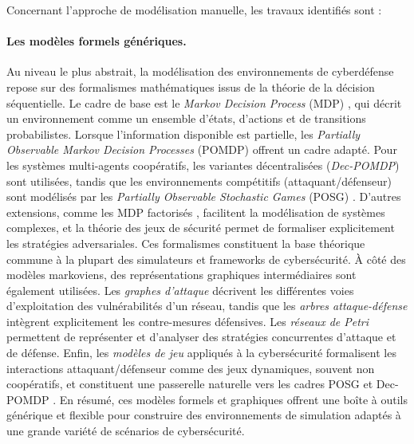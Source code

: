 Concernant l'approche de modélisation manuelle, les travaux identifiés sont :

\paragraph{Les modèles formels génériques.}
Au niveau le plus abstrait, la modélisation des environnements de cyberdéfense repose sur des formalismes mathématiques issus de la théorie de la décision séquentielle. Le cadre de base est le \textit{Markov Decision Process} (MDP) \cite{puterman1994mdp}, qui décrit un environnement comme un ensemble d’états, d’actions et de transitions probabilistes. Lorsque l’information disponible est partielle, les \textit{Partially Observable Markov Decision Processes} (POMDP) \cite{kaelbling1998pomdp} offrent un cadre adapté. Pour les systèmes multi-agents coopératifs, les variantes décentralisées (\textit{Dec-POMDP}) \cite{Oliehoek2016} sont utilisées, tandis que les environnements compétitifs (attaquant/défenseur) sont modélisés par les \textit{Partially Observable Stochastic Games} (POSG) \cite{hansen2004posg}. D’autres extensions, comme les MDP factorisés \cite{guestrin2003factored}, facilitent la modélisation de systèmes complexes, et la théorie des jeux de sécurité \cite{manshaei2013game} permet de formaliser explicitement les stratégies adversariales.
Ces formalismes constituent la base théorique commune à la plupart des simulateurs et frameworks de cybersécurité. À côté des modèles markoviens, des représentations graphiques intermédiaires sont également utilisées. Les \textit{graphes d’attaque} \cite{CPhilips1998} décrivent les différentes voies d’exploitation des vulnérabilités d’un réseau, tandis que les \textit{arbres attaque-défense} \cite{BKordy2010} intègrent explicitement les contre-mesures défensives. Les \textit{réseaux de Petri} \cite{MPetty2022,JBland2020,SYamaguchi2020} permettent de représenter et d’analyser des stratégies concurrentes d’attaque et de défense. Enfin, les \textit{modèles de jeu} appliqués à la cybersécurité \cite{MPanfili2018,AAttiah2018,CXiaolin2008} formalisent les interactions attaquant/défenseur comme des jeux dynamiques, souvent non coopératifs, et constituent une passerelle naturelle vers les cadres POSG et Dec-POMDP \cite{beynier2010,terry2020pettingzoo,bernstein2013}.
En résumé, ces modèles formels et graphiques offrent une boîte à outils générique et flexible pour construire des environnements de simulation adaptés à une grande variété de scénarios de cybersécurité.

